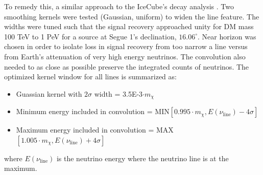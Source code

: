 To remedy this, a similar approach to the IceCube's decay analysis \cite{Minjin_icrc23}.
Two smoothing kernels were tested (Gaussian, uniform) to widen the line feature.
The widths were tuned such that the signal recovery approached unity for DM mass 100 TeV to 1 PeV for a source at Segue 1's declination, $16.06^\circ$.
Near horizon was chosen in order to isolate loss in signal recovery from too narrow a line versus from Earth's attenuation of very high energy neutrinos.
The convolution also needed to as close as possible preserve the integrated counts of neutrinos.
The optimized kernel window for all lines is summarized as:
\begin{itemize}
    \item Guassian kernel with $2 \sigma$ width = 3.5E-3$\cdot m_\chi$
    \item Minimum energy included in convolution = MIN$[0.995 \cdot m_\chi, E(\nu_\mathrm{line}) -4\sigma]$
    \item Maximum energy included in convolution = MAX$[1.005 \cdot m_\chi, E(\nu_\mathrm{line}) +4\sigma]$
\end{itemize}
where $E(\nu_{\mathrm{line}})$ is the neutrino energy where the neutrino line is at the maximum.

